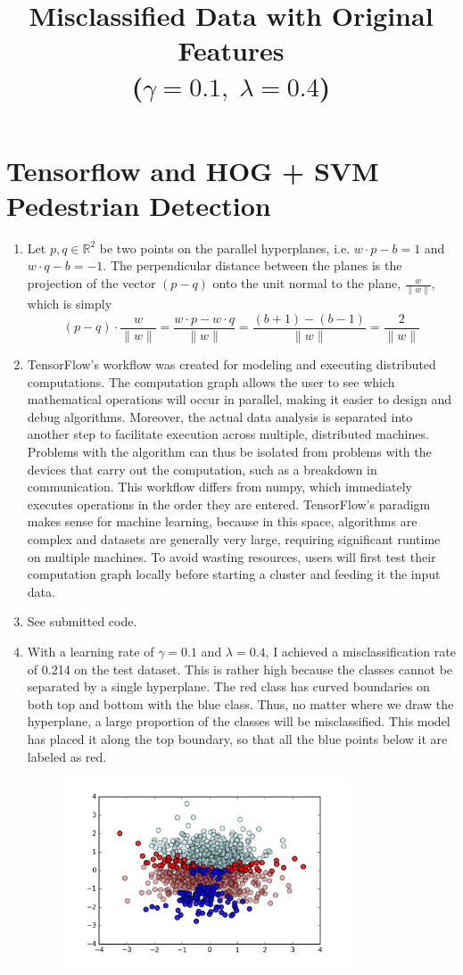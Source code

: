 \documentclass[12pt]{article}
\begin{document}
\section{Tensorflow and HOG + SVM Pedestrian Detection}
\begin{enumerate}
	\item Let $p, q \in \mathbb{R}^2$ be two points on the parallel hyperplanes, i.e. $w \cdot p - b = 1$ and $w \cdot q - b = -1$. The perpendicular distance between the planes is the projection of the vector $(p - q)$ onto the unit normal to the plane, $\frac{w}{\|w\|}$, which is simply
	\[
		(p - q) \cdot \frac{w}{\|w\|} = \frac{w \cdot p - w \cdot q}{\|w\|} = \frac{(b+1) - (b-1)}{\|w\|} = \frac{2}{\|w\|}
	\]
	\item TensorFlow's workflow was created for modeling and executing distributed computations. The computation graph allows the user to see which mathematical operations will occur in parallel, making it easier to design and debug algorithms. Moreover, the actual data analysis is separated into another step to facilitate execution across multiple, distributed machines. Problems with the algorithm can thus be isolated from problems with the devices that carry out the computation, such as a breakdown in communication. This workflow differs from numpy, which immediately executes operations in the order they are entered. TensorFlow's paradigm makes sense for machine learning, because in this space, algorithms are complex and datasets are generally very large, requiring significant runtime on multiple machines. To avoid wasting resources, users will first test their computation graph locally before starting a cluster and feeding it the input data.
	\item See submitted code.
	\item With a learning rate of $\gamma = 0.1$ and $\lambda = 0.4$, I achieved a misclassification rate of 0.214 on the test dataset. This is rather high because the classes cannot be separated by a single hyperplane. The red class has curved boundaries on both top and bottom with the blue class. Thus, no matter where we draw the hyperplane, a large proportion of the classes will be misclassified. This model has placed it along the top boundary, so that all the blue points below it are labeled as red.
	\begin{figure}[H]
		\centering
		\title{\bf Misclassified Data with Original Features \\
			($\gamma = 0.1, \; \lambda = 0.4$)}
		\includegraphics[width=0.8\textwidth]{../Figures/hw2_3_iv.png}

\end{figure}
\end{enumerate}
\end{document}

